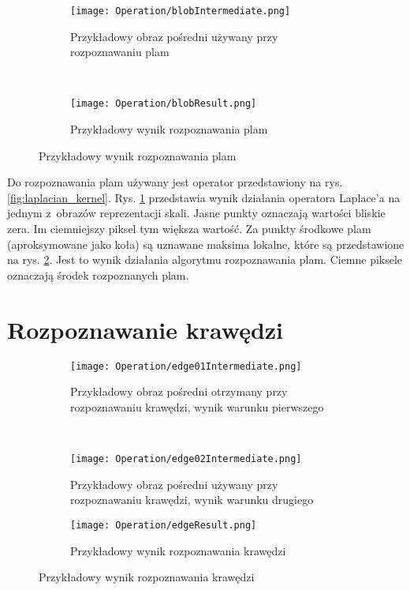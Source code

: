 \begin{figure}[h]
\begin{center}

\begin{subfigure}[t]{0.4\textwidth}
\texttt{[image: Operation/blobIntermediate.png]}
\caption{Przykładowy obraz pośredni używany przy rozpoznawaniu plam}
\label{fig:blobIntermediate}
\end{subfigure}
~
\begin{subfigure}[t]{0.4\textwidth}
\texttt{[image: Operation/blobResult.png]}
\caption{Przykładowy wynik rozpoznawania plam}
\label{fig:blobResult}
\end{subfigure}

\end{center}
\label{fig:showBlob}
\end{figure}

Do rozpoznawania plam używany jest operator przedstawiony na rys. \ref{fig:laplacian_kernel}. Rys. \ref{fig:blobIntermediate} przedstawia wynik działania operatora Laplace'a na jednym z~obrazów reprezentacji skali. Jasne punkty oznaczają wartości bliskie zera. Im ciemniejszy piksel tym większa wartość. Za punkty środkowe plam (aproksymowane jako koła) są uznawane maksima lokalne, które są przedstawione na rys. \ref{fig:blobResult}. Jest to wynik działania algorytmu rozpoznawania plam. Ciemne piksele oznaczają środek rozpoznanych plam.

\section{Rozpoznawanie krawędzi}
\label{sec:dzialanieEdge}

\begin{figure}[h]
\begin{center}

\begin{subfigure}[t]{0.4\textwidth}
\texttt{[image: Operation/edge01Intermediate.png]}
\caption{Przykładowy obraz pośredni otrzymany przy rozpoznawaniu krawędzi, wynik warunku pierwszego}
\label{fig:edgeIntermediate1}
\end{subfigure}
~
\begin{subfigure}[t]{0.4\textwidth}
\texttt{[image: Operation/edge02Intermediate.png]}
\caption{Przykładowy obraz pośredni używany przy rozpoznawaniu krawędzi, wynik warunku drugiego}
\label{fig:edgeIntermediate2}
\end{subfigure}

\begin{subfigure}[t]{0.4\textwidth}
\texttt{[image: Operation/edgeResult.png]}
\caption{Przykładowy wynik rozpoznawania krawędzi}
\label{fig:edgeResult}
\end{subfigure}

\end{center}
\label{fig:showEdge}
\end{figure}

